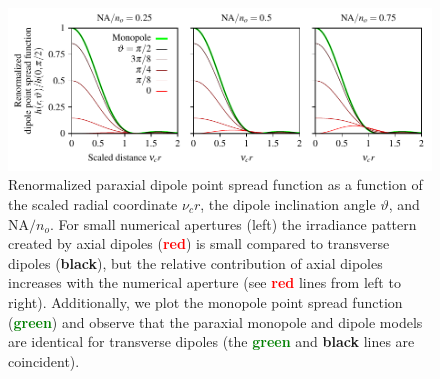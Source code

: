 \documentclass[]{osa-article}
\begin{document}
\begin{figure}[ht]
 \centering
   \centering
   \includegraphics[scale=0.8]{../figures/paratfs/dpsf.pdf}
   \caption{Renormalized paraxial dipole point spread function as a function of
     the scaled radial coordinate $\nu_c r$, the dipole inclination angle
     $\vartheta$, and $\text{NA}/n_o$. For small numerical apertures (left) the
     irradiance pattern created by axial dipoles (\textcolor{red}{\textbf{red}})
     is small compared to transverse dipoles (\textbf{black}), but the relative
     contribution of axial dipoles increases with the numerical aperture (see
     \textcolor{red}{\textbf{red}} lines from left to right). Additionally, we
     plot the monopole point spread function (\textcolor{green}{\textbf{green}})
     and observe that the paraxial monopole and dipole models are identical for
     transverse dipoles (the \textcolor{green}{\textbf{green}} and
     \textbf{black} lines are coincident).}
   \label{fig:hdet}
 \end{figure}
 
\end{document}
